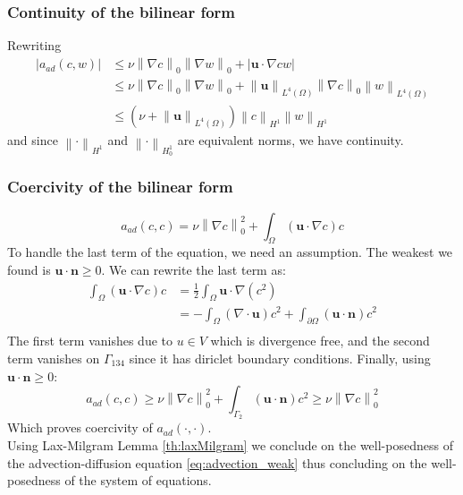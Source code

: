 \documentclass[conference]{IEEEtran}
\newcommand{\norm}[1]{\left\lVert#1\right\rVert}
\begin{document}
\subsubsection{Continuity of the bilinear form} Rewriting
\begin{align}
	  |a_{ad}(c,w)| 
      & \leq \nu \norm{\nabla c}_0 \norm{\nabla w}_0 + | \textbf{u} \cdot \nabla c w | \\
      & \leq \nu \norm{\nabla c}_0 \norm{\nabla w}_0 + \norm{\textbf{u}}_{L^4(\Omega)} \norm{\nabla c}_0 \norm{w}_{L^4(\Omega)} \\
      & \leq (\nu + \norm{\textbf{u}}_{L^4(\Omega)}) \norm{c}_{H^1} \norm{w}_{H^1}
\end{align}
and since $\norm{\cdot}_{H^1}$ and $\norm{\cdot}_{H^1_0}$ are equivalent norms, we have continuity.

\subsubsection{Coercivity of the bilinear form} 
\begin{equation}
      a_{ad}(c,c) = \nu \norm{\nabla c}_0^2 + \int_{\Omega} (\textbf{u}\cdot \nabla c) c
\end{equation}
To handle the last term of the equation, we need an assumption. The weakest we found is $\textbf{u} \cdot \textbf{n} \geq 0$. We can rewrite the last term as:
\begin{align}
      \int_{\Omega} (\textbf{u}\cdot \nabla c) c 
      & = \frac{1}{2} \int_{\Omega} \textbf{u}\cdot \nabla (c^2) \\
      & = - \int_{\Omega} (\nabla \cdot \textbf{u}) c^2 + \int_{\partial \Omega} (\textbf{u} \cdot \textbf{n}) c^2 \\
\end{align}
The first term vanishes due to $u\in V$ which is divergence free, and the second term vanishes on $\Gamma_{134}$ since it has diriclet boundary conditions.
Finally, using $\textbf{u} \cdot \textbf{n} \geq 0$:
\begin{equation}
      a_{ad}(c,c) \geq \nu \norm{\nabla c}_0^2 + \int_{\Gamma_2} (\textbf{u}\cdot \textbf{n}) c^2
      \geq \nu \norm{\nabla c}_0^2
\end{equation}
Which proves coercivity of $a_{ad}(\cdot,\cdot)$.\\



Using Lax-Milgram Lemma \ref{th:laxMilgram} we conclude on the well-posedness of the advection-diffusion equation \ref{eq:advection_weak} thus concluding on the well-posedness of the system of equations.
\end{document}
